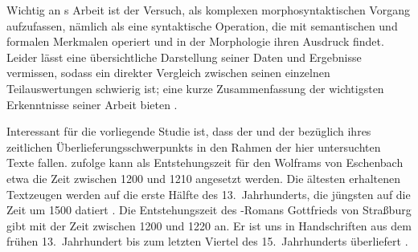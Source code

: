Wichtig an \citeauthor{askedal1973}s Arbeit ist der Versuch,
 als komplexen morphosyntaktischen Vorgang aufzufassen, nämlich als
eine syntaktische Operation, die mit semantischen und
formalen Merkmalen operiert und in der Morphologie
ihren Ausdruck findet. Leider lässt \citet{askedal1973} eine übersichtliche
Darstellung seiner Daten und Ergebnisse vermissen, sodass ein direkter
Vergleich zwischen seinen einzelnen Teilauswertungen schwierig ist; eine kurze
Zusammenfassung der wichtigsten Erkenntnisse seiner Arbeit bieten
\citet[118--119]{fleischerschallert2011}.

Interessant für die vorliegende Studie ist, dass der  und der
 bezüglich ihres zeitlichen
Überlieferungsschwerpunkts in den
Rahmen der hier untersuchten Texte fallen. \citet[1378]{bumke1999} zufolge kann
als Entstehungszeit für den  Wolframs von Eschenbach etwa die
Zeit zwischen 1200 und 1210 angesetzt werden. Die ältesten erhaltenen
Textzeugen werden auf die erste Hälfte des 13.~Jahrhunderts, die jüngsten auf
die Zeit um 1500 datiert
\autocites[1381]{bumke1999}[vgl.~auch][s.\,v.~\textit{Wolfram von Eschenbach:
}]{hsc}. Die Entstehungszeit des -Romans Gottfrieds
von Straßburg gibt \citet[155]{kuhn1982} mit der
Zeit zwischen 1200 und 1220 an. Er ist uns in Handschriften aus dem frühen
13.~Jahrhundert bis zum letzten Viertel des 15.~Jahrhunderts überliefert
\autocite[vgl.][s.\,v.~\textit{Gottfried von Straßburg: }]{hsc}.

